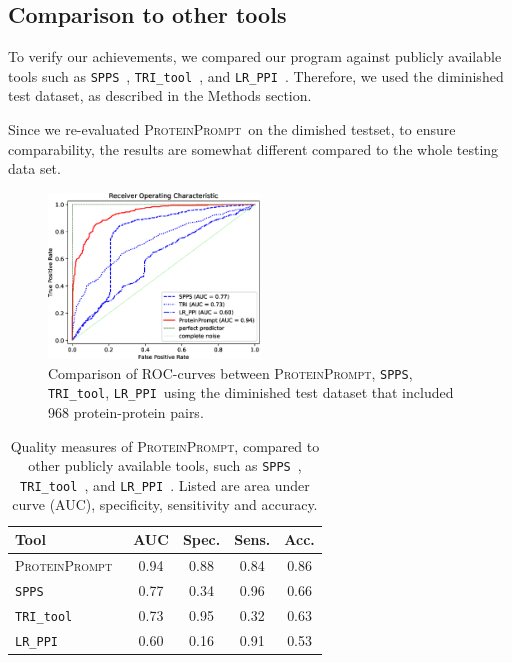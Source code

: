 \documentclass{bioinfo}
\newcommand{\spps}{\texttt{SPPS}}
\newcommand{\tri}{\texttt{TRI\_tool}}
\newcommand{\lr}{\texttt{LR\_PPI}}
\newcommand{\tool}{\textsc{ProteinPrompt}}
\begin{document}
\subsection{Comparison to other tools}

To verify our achievements, we compared our program against publicly
available tools such as \spps\ \citep{Liu:2012}, \tri\
\citep{Perovic:2017}, and \lr\ \citep{Pan:2010}. Therefore, we used the
diminished test dataset, as described in the Methods section. 

Since we re-evaluated \tool\  on the dimished testset, to ensure
comparability, the results are somewhat different compared to the
whole testing data set. 

\begin{figure}
  \includegraphics[width=0.5\textwidth]{img/comparison_roc.eps}
  \caption{Comparison of ROC-curves between \tool, \spps, \tri, \lr\ 
    using the diminished test dataset that included 968
    protein-protein pairs.}
  \label{fig:comparison}
\end{figure}


\begin{table}
\begin{tabular}{|l |c | c | c | c |}
  \hline
  Tool  & AUC & Spec. & Sens. & Acc. \\
  \hline
  \tool\   & 0.94 & 0.88 & 0.84 &  0.86 \\
  \hline
  \spps\  & 0.77 & 0.34 & 0.96 & 0.66 \\
  \hline
  \tri\  & 0.73 & 0.95 & 0.32 & 0.63 \\
  \hline
  \lr\  & 0.60 & 0.16 & 0.91 & 0.53  \\
  \hline
\end{tabular}
\caption{ Quality measures of \tool, compared to other publicly
  available tools, such as \spps\ \citep{Liu:2012}, \tri\
  \citep{Perovic:2017}, and \lr\ \citep{Pan:2010}.
  Listed are area under curve (AUC), specificity, sensitivity and accuracy.}
\label{table:comparison}
\end{table}
\end{document}
